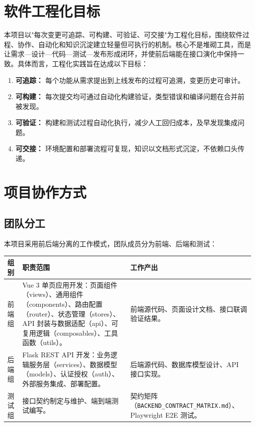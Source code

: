 \documentclass[12pt,a4paper]{ctexart}
\begin{document}
\tableofcontents\clearpage{}

\section{软件工程化目标}
本项目以"每次变更可追踪、可构建、可验证、可交接"为工程化目标，围绕软件过程、协作、自动化和知识沉淀建立轻量但可执行的机制。核心不是堆砌工具，而是让需求—设计—代码—测试—发布形成闭环，并使前后端能在接口演化中保持一致。具体而言，工程化实践旨在达成以下目标：
\begin{enumerate}
\item \textbf{可追踪：} 每个功能从需求提出到上线发布的过程可追溯，变更历史可审计。
\item \textbf{可构建：} 每次提交均可通过自动化构建验证，类型错误和编译问题在合并前被发现。
\item \textbf{可验证：} 构建和测试过程自动化执行，减少人工回归成本，及早发现集成问题。
\item \textbf{可交接：} 环境配置和部署流程可复现，知识以文档形式沉淀，不依赖口头传递。
\end{enumerate}

\section{项目协作方式}
\subsection{团队分工}
本项目采用前后端分离的工作模式，团队成员分为前端、后端和测试：
\begin{center}
\noindent\begin{tabularx}{\textwidth}{p{2.5cm}Y Y}
\toprule 组别 & 职责范围 & 工作产出 \\\midrule
前端组 & Vue 3 单页应用开发：页面组件（views）、通用组件（components）、路由配置（router）、状态管理（stores）、API 封装与数据适配（api）、可复用逻辑（composables）、工具函数（utils）。 & 前端源代码、页面设计文档、接口联调验证结果。 \\
后端组 & Flask REST API 开发：业务逻辑服务层（services）、数据模型（models）、认证授权（auth）、外部服务集成、部署配置。 & 后端源代码、数据库模型设计、API 接口实现。 \\
测试组 & 接口契约制定与维护、端到端测试编写。 & 契约矩阵（\texttt{BACKEND\_CONTRACT\_MATRIX.md}）、Playwright E2E 测试。 \\
\bottomrule
\end{tabularx}
\end{center}
\end{document}
